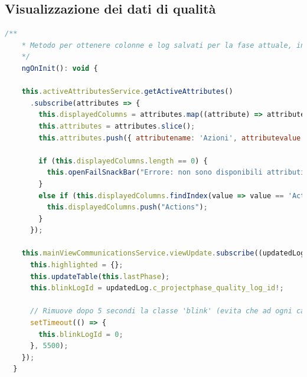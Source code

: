 
\subsection*{Visualizzazione dei dati di qualità}
\begin{lstlisting}[language=JavaScript, caption={Aggiornamento degli attributi caratterizzanti il controllo qualità}]
    /**
    * Metodo per ottenere colonne e log salvati per la fase attuale, indica quando il caricamento e' terminato (per far sparire lo splash-screen)
    */
    ngOnInit(): void {

    this.activeAttributesService.getActiveAttributes()
      .subscribe(attributes => {
        this.displayedColumns = attributes.map((attribute) => attribute.attributevalue!);
        this.attributes = attributes.slice();
        this.attributes.push({ attributename: 'Azioni', attributevalue: 'Actions' });

        if (this.displayedColumns.length == 0) {
          this.openFailSnackBar("Errore: non sono disponibili attributi per la fase selezionata!", "X");
        }
        else if (this.displayedColumns.findIndex(value => value == 'Actions') == -1) {
          this.displayedColumns.push("Actions");
        }
      });

    this.mainViewCommunicationsService.viewUpdate.subscribe((updatedLog) => {
      this.highlighted = {};
      this.updateTable(this.lastPhase);
      this.blinkLogId = updatedLog.c_projectphase_quality_log_id!;

      // Rimuove dopo 5 secondi la classe 'blink' (evita che ad ogni cambio di tema l'ultima fase aggiunta / modificata venga evidenziata)
      setTimeout(() => {
        this.blinkLogId = 0;
      }, 5500);
    });
  }
\end{lstlisting}

